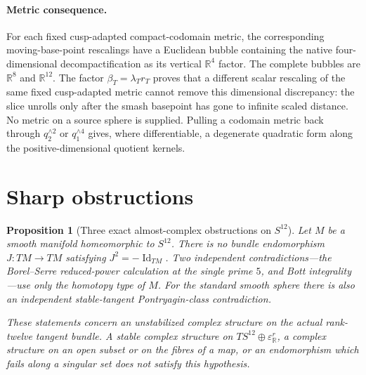 \documentclass[11pt,letterpaper]{article}
\numberwithin{equation}{section}
\newtheorem{proposition}[theorem]{Proposition}
\theoremstyle{definition}
\theoremstyle{remark}
\newcommand{\R}{\mathbb R}
\begin{document}
\paragraph{Metric consequence.}
For each fixed cusp-adapted compact-codomain metric, the corresponding
moving-base-point rescalings have a Euclidean bubble containing the native
four-dimensional decompactification as its vertical \(\R^4\) factor.  The
complete bubbles are \(\R^8\) and \(\R^{12}\).  The factor
\(\beta_T=\lambda_Tr_T\) proves that a different scalar rescaling of the
same fixed cusp-adapted metric cannot remove this dimensional discrepancy:
the slice unrolls only after the smash basepoint has gone to infinite
scaled distance.  No metric on a source sphere is supplied.  Pulling a
codomain metric back through \(q_2^{\wedge2}\) or \(q_1^{\wedge4}\) gives,
where differentiable, a degenerate quadratic form along the
positive-dimensional quotient kernels.

\section{Sharp obstructions}

\begin{proposition}[Three exact almost-complex obstructions on \(S^{12}\)]
\label{prop:S12-almost-complex-obstruction}
Let \(M\) be a smooth manifold homeomorphic to \(S^{12}\).  There is no
bundle endomorphism \(J:TM\to TM\) satisfying
\(J^2=-\operatorname{Id}_{TM}\).  Two independent contradictions---the
Borel--Serre reduced-power calculation at the single prime \(5\), and Bott
integrality---use only the homotopy type of \(M\).  For the standard smooth
sphere there is also an independent stable-tangent Pontryagin-class
contradiction.

These statements concern an unstabilized complex structure on the actual
rank-twelve tangent bundle.  A stable complex structure on
\(TS^{12}\oplus\varepsilon^r_{\R}\), a complex structure on an open subset
or on the fibres of a map, or an endomorphism which fails along a singular
set does not satisfy this hypothesis.
\end{proposition}
\end{document}
